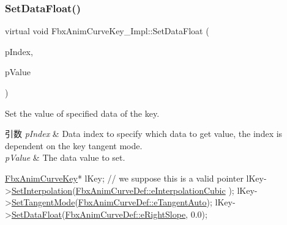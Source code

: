 \subsubsection{\texorpdfstring{Set\+Data\+Float()}{SetDataFloat()}}
{\footnotesize\ttfamily virtual void Fbx\+Anim\+Curve\+Key\+\_\+\+Impl\+::\+Set\+Data\+Float (\begin{DoxyParamCaption}\item[{\hyperlink{class_fbx_anim_curve_def_a3be261d961f8226235529b148cf80300}{Fbx\+Anim\+Curve\+Def\+::\+E\+Data\+Index}}]{p\+Index,  }\item[{float}]{p\+Value }\end{DoxyParamCaption})\hspace{0.3cm}{\ttfamily [pure virtual]}}

Set the value of specified data of the key. 
\begin{DoxyParams}{引数}
{\em p\+Index} & Data index to specify which data to get value, the index is dependent on the key tangent mode. \\
\hline
{\em p\+Value} & The data value to set.\\
\hline
\end{DoxyParams}

\begin{DoxyCode}
\hyperlink{class_fbx_anim_curve_key}{FbxAnimCurveKey}* lKey; \textcolor{comment}{// we suppose this is a valid pointer}
lKey->\hyperlink{class_fbx_anim_curve_key_a10777e9392725191bd6ab1d425460406}{SetInterpolation}(\hyperlink{class_fbx_anim_curve_def_add2ab7d10d856ab0868cc9b143d59ea5a16ef50fcdbb8ae99246f06e12f9d3dae}{FbxAnimCurveDef::eInterpolationCubic}
      );
lKey->\hyperlink{class_fbx_anim_curve_key_a8a8a090694fc042e9b234e40918faf8e}{SetTangentMode}(\hyperlink{class_fbx_anim_curve_def_ac810ccc5ca0527704ab5175479964b87a56e3bad364851277281e94e81327dd25}{FbxAnimCurveDef::eTangentAuto});
lKey->\hyperlink{class_fbx_anim_curve_key_ad61a4843c52e4ba3a21102c577950dc5}{SetDataFloat}(\hyperlink{class_fbx_anim_curve_def_a3be261d961f8226235529b148cf80300a97c20bbd5b06a532773ffd8c88624ec2}{FbxAnimCurveDef::eRightSlope}, 0.0);
\end{DoxyCode}
 \mbox{\label{class_fbx_anim_curve_key___impl_af7693712573d103db3de8984f2993f99}} 
